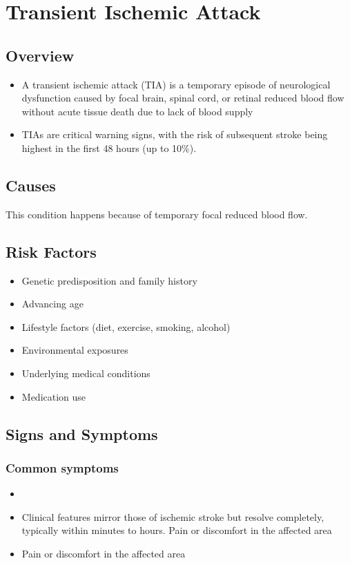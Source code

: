 \chapter{Transient Ischemic Attack}
\label{sec:Transient Ischemic Attack}

\section{Overview}


\begin{itemize}[noitemsep]
  \item A transient ischemic attack (TIA) is a temporary episode of neurological dysfunction caused by focal brain, spinal cord, or retinal reduced blood flow without acute tissue death due to lack of blood supply
  \item TIAs are critical warning signs, with the risk of subsequent stroke being highest in the first 48 hours (up to 10\%).
\end{itemize}
\section{Causes}
This condition happens because of temporary focal reduced blood flow.     
\section{Risk Factors}

\begin{itemize}[noitemsep]
  \item Genetic predisposition and family history
  \item Advancing age
  \item Lifestyle factors (diet, exercise, smoking, alcohol)
  \item Environmental exposures
  \item Underlying medical conditions
  \item Medication use
\end{itemize}
\section{Signs and Symptoms}

\subsection{Common symptoms}
\begin{itemize}[noitemsep]
  \item \item Clinical features mirror those of ischemic stroke but resolve completely, typically within minutes to hours. Pain or discomfort in the affected area    \item Pain or discomfort in the affected area
  \end{itemize}

